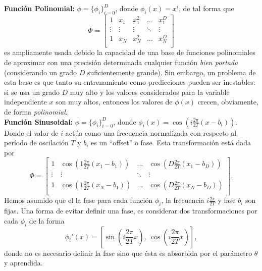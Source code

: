 \noindent\textbf{Función Polinomial:} $\phi=\{\phi_i\}_{i=0}^D$, donde $\phi_i(x)=x^i$, de tal forma que 
\begin{equation}
    \Phi = \left[ \begin{matrix} 1 & x_1 & x_1^2 & \ldots & x_1^D\\
    \vdots & \vdots & \vdots & \ddots & \vdots \\
    1 & x_N & x_N^2 & \ldots & x_N^D\\
    \end{matrix} \right]
\end{equation}
es ampliamente usada debido la capacidad de una base de funciones polinomiales de aproximar con una precisión determinada cualquier función \emph{bien portada} (considerando un grado  $D$ suficientemente  grande). Sin embargo, un problema de esta  base es que tanto su entrenamiento como  predicciones pueden ser inestables: si se usa un grado $D$ muy alto y los valores considerados para la variable independiente  $x$ son muy altos, entonces los valores de $\phi(x)$ crecen, obviamente, de forma \emph{polinomial}.\\

\noindent\textbf{Función Sinusoidal:} $\phi=\{\phi_i\}_{i=0}^D$, donde $\phi_i(x)=\cos\left(i\frac{2\pi}{2T}(x - b_i)\right)$. Donde el valor de  $i$ actúa como una frecuencia normalizada con respecto al período de oscilación $T$ y $b_i$ es un ``offset''  o fase. Esta transformación está dada por
\begin{equation}
    \Phi = \left[ \begin{matrix}
    1 & \cos\left(1\frac{2\pi}{2T}(x_1-b_1)\right) & \ldots & \cos\left(D\frac{2\pi}{2T}(x_1-b_D)\right)\\
    \vdots & \vdots  & \ddots & \vdots \\
    1 & \cos\left(1\frac{2\pi}{2T}(x_N-b_1)\right) & \ldots & \cos\left(D\frac{2\pi}{2T}(x_N-b_D)\right)\\
    \end{matrix} \right].
\end{equation}
Hemos asumido que el la fase para cada función $\phi_i$, la frecuencia $i\frac{2\pi}{2T}$ y fase $b_i$ son fijas. Una forma de evitar definir una fase, es considerar dos transformaciones por cada $\phi_i$ de la forma
\begin{equation}
    \phi_i'(x) = \left[\sin\left(i\frac{2\pi}{2T}x\right),\ \cos\left(i\frac{2\pi}{2T}x\right)\right],
\end{equation}
donde no es necesario definir la fase sino que ésta es absorbida por el parámetro $\theta$ y aprendida.  

